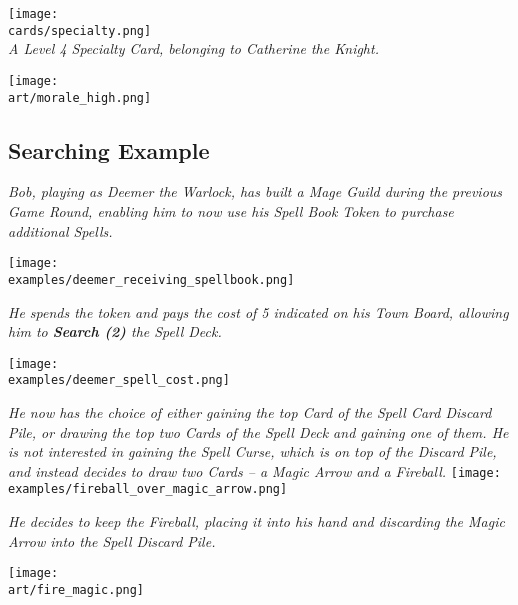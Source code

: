 \begin{multicols*}{2}
{
  \centering
  \texttt{[image: \\cards/specialty.png]}\\
  \medskip
  \footnotesize\textit{A Level 4 Specialty Card, belonging to Catherine the Knight.}
}

\bigbreak


\vfill

\begin{center}
  \texttt{[image: \\art/morale\_high.png]}
\end{center}

\vfill

\subsection*{Searching Example}

\textit{Bob, playing as Deemer the Warlock, has built a Mage Guild during the previous Game Round, enabling him to now use his Spell Book Token to purchase additional Spells.}\par
\texttt{[image: \\examples/deemer\_receiving\_spellbook.png]}\par
\textit{He spends the token and pays the cost of 5  indicated on his Town Board, allowing him to \textbf{Search (2)} the Spell Deck.}\par
\texttt{[image: \\examples/deemer\_spell\_cost.png]}\par
\filbreak
\textit{He now has the choice of either gaining the top Card of the Spell Card Discard Pile, or drawing the top two Cards of the Spell Deck and gaining one of them.
He is not interested in gaining the Spell Curse, which is on top of the Discard Pile, and instead decides to draw two Cards – a Magic Arrow and a Fireball.}
\texttt{[image: \\examples/fireball\_over\_magic\_arrow.png]}\par
\textit{He decides to keep the Fireball, placing it into his hand and discarding the Magic Arrow into the Spell Discard Pile.}

\vspace*{\fill}

\hfill\texttt{[image: \\art/fire\_magic.png]}

\end{multicols*}
